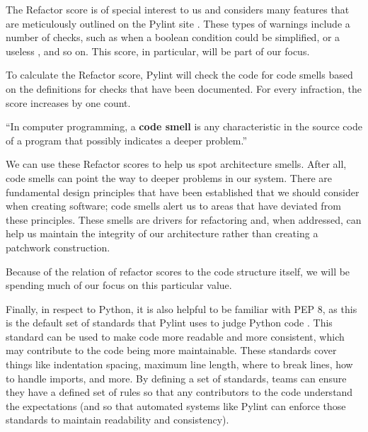 The Refactor score is of special interest to us and considers many features that are meticulously outlined on the Pylint site \cite{pylint:refactor}. These types of warnings include a number of checks, such as when a boolean condition could be simplified, or a useless , and so on. This score, in particular, will be part of our focus.

To calculate the Refactor score, Pylint will check the code for code smells based on the definitions for checks that have been documented. For every infraction, the score increases by one count. 


\vspace{0.25cm}
\begin{displayquote}
``In computer programming, a \textbf{code smell} is any characteristic in the source code of a program that possibly indicates a deeper problem.'' \cite{wiki:code-smells}
\end{displayquote}
\vspace{0.25cm}

We can use these Refactor scores to help us spot architecture smells. After all, code smells can point the way to deeper problems in our system. There are fundamental design principles that have been established that we should consider when creating software; code smells alert us to areas that have deviated from these principles. These smells are drivers for refactoring and, when addressed, can help us maintain the integrity of our architecture rather than creating a patchwork construction.

Because of the relation of refactor scores to the code structure itself, we will be spending much of our focus on this particular value. 

Finally, in respect to Python, it is also helpful to be familiar with PEP 8, as this is the default set of standards that Pylint uses to judge Python code \cite{pylint:pep8}. This standard can be used to make code more readable and more consistent, which may contribute to the code being more maintainable. These standards cover things like indentation spacing, maximum line length, where to break lines, how to handle imports, and more. By defining a set of standards, teams can ensure they have a defined set of rules so that any contributors to the code understand the expectations (and so that automated systems like Pylint can enforce those standards to maintain readability and consistency).

